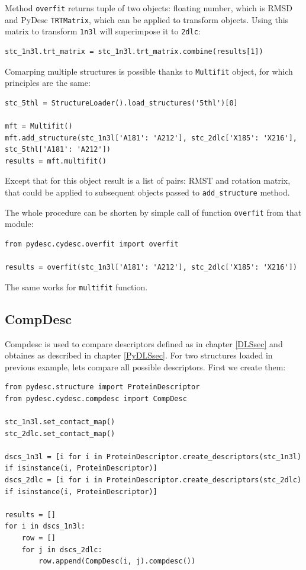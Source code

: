 \documentclass{article}
\begin{document}
Method \texttt{overfit} returns tuple of two objects: floating number, which is RMSD and PyDesc \texttt{TRTMatrix}, which can be applied to transform objects. Using this matrix to transform \texttt{1n3l} will superimpose it to \texttt{2dlc}:

\begin{lstlisting}
stc_1n3l.trt_matrix = stc_1n3l.trt_matrix.combine(results[1])
\end{lstlisting}

Comarping multiple structures is possible thanks to \texttt{Multifit} object, for which principles are the same:

\begin{lstlisting}
stc_5thl = StructureLoader().load_structures('5thl')[0]

mft = Multifit()
mft.add_structure(stc_1n3l['A181': 'A212'], stc_2dlc['X185': 'X216'], stc_5thl['A181': 'A212'])
results = mft.multifit()
\end{lstlisting}

Except that for this object result is a list of pairs: RMST and rotation matrix, that could be applied to subsequent objects passed to \texttt{add\_{}structure} method.

The whole procedure can be shorten by simple call of function \texttt{overfit} from that module:

\begin{lstlisting}
from pydesc.cydesc.overfit import overfit

results = overfit(stc_1n3l['A181': 'A212'], stc_2dlc['X185': 'X216'])
\end{lstlisting}

The same works for \texttt{multifit} function.

%
%
\subsection{CompDesc}

Compdesc is used to compare descriptors defined as in chapter \ref{DLSsec} and obtaines as described in chapter \ref{PyDLSsec}. For two structures loaded in previous example, lets compare all possible descriptors. First we create them:

\begin{lstlisting}
from pydesc.structure import ProteinDescriptor
from pydesc.cydesc.compdesc import CompDesc

stc_1n3l.set_contact_map()
stc_2dlc.set_contact_map()

dscs_1n3l = [i for i in ProteinDescriptor.create_descriptors(stc_1n3l) if isinstance(i, ProteinDescriptor)]
dscs_2dlc = [i for i in ProteinDescriptor.create_descriptors(stc_2dlc) if isinstance(i, ProteinDescriptor)]

results = []
for i in dscs_1n3l:
    row = []
    for j in dscs_2dlc:
        row.append(CompDesc(i, j).compdesc())
\end{lstlisting}
\end{document}
